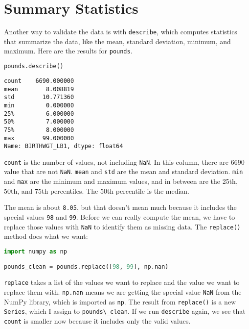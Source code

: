 \hypertarget{summary-statistics}{%
\section{Summary Statistics}\label{summary-statistics}}

Another way to validate the data is with
\passthrough{\lstinline!describe!}, which computes statistics that
summarize the data, like the mean, standard deviation, minimum, and
maximum. Here are the results for \passthrough{\lstinline!pounds!}.

\begin{lstlisting}[language=Python,style=source]
pounds.describe()
\end{lstlisting}

\begin{lstlisting}[style=output]
count    6690.000000
mean        8.008819
std        10.771360
min         0.000000
25%         6.000000
50%         7.000000
75%         8.000000
max        99.000000
Name: BIRTHWGT_LB1, dtype: float64
\end{lstlisting}

\passthrough{\lstinline!count!} is the number of values, not including
\passthrough{\lstinline!NaN!}. In this column, there are 6690 value that
are not \passthrough{\lstinline!NaN!}. \passthrough{\lstinline!mean!}
and \passthrough{\lstinline!std!} are the mean and standard deviation.
\passthrough{\lstinline!min!} and \passthrough{\lstinline!max!} are the
minimum and maximum values, and in between are the 25th, 50th, and 75th
percentiles. The 50th percentile is the median.

The mean is about \passthrough{\lstinline!8.05!}, but that doesn't mean
much because it includes the special values \passthrough{\lstinline!98!}
and \passthrough{\lstinline!99!}. Before we can really compute the mean,
we have to replace those values with \passthrough{\lstinline!NaN!} to
identify them as missing data. The \passthrough{\lstinline!replace()!}
method does what we want:

\begin{lstlisting}[language=Python,style=source]
import numpy as np

pounds_clean = pounds.replace([98, 99], np.nan)
\end{lstlisting}

\passthrough{\lstinline!replace!} takes a list of the values we want to
replace and the value we want to replace them with.
\passthrough{\lstinline!np.nan!} means we are getting the special value
\passthrough{\lstinline!NaN!} from the NumPy library, which is imported
as \passthrough{\lstinline!np!}. The result from
\passthrough{\lstinline!replace()!} is a new
\passthrough{\lstinline!Series!}, which I assign to
\passthrough{\lstinline!pounds\_clean!}. If we run
\passthrough{\lstinline!describe!} again, we see that
\passthrough{\lstinline!count!} is smaller now because it includes only
the valid values.


